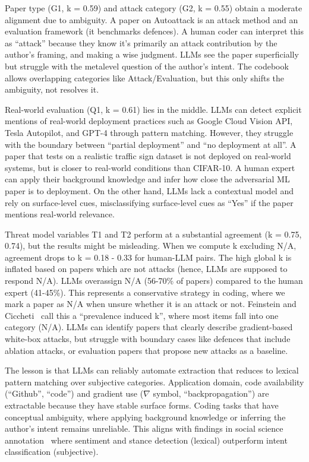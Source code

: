 \documentclass[conference,compsoc]{IEEEtran}
\begin{document}
Paper type (G1, k = 0.59) and attack category (G2, k = 0.55) obtain a moderate alignment due to ambiguity. A paper on Autoattack is an attack method and an evaluation framework (it benchmarks defences). A human coder can interpret this as ``attack'' because they know it's primarily an attack contribution by the author's framing, and making a wise judgment. LLMs see the paper superficially but struggle with the metalevel question of the author's intent. The codebook allows overlapping categories like Attack/Evaluation, but this only shifts the ambiguity, not resolves it.

Real-world evaluation (Q1, k = 0.61) lies in the middle. LLMs can detect explicit mentions of real-world deployment practices such as Google Cloud Vision API, Tesla Autopilot, and GPT-4 through pattern matching. However, they struggle with the boundary between ``partial deployment'' and ``no deployment at all''. A paper that tests on a realistic traffic sign dataset is not deployed on real-world systems, but is closer to real-world conditions than CIFAR-10. A human expert can apply their background knowledge and infer how close the adversarial ML paper is to deployment. On the other hand, LLMs lack a contextual model and rely on surface-level cues, misclassifying surface-level cues as ``Yes'' if the paper mentions real-world relevance.

Threat model variables T1 and T2 perform at a substantial agreement (k = 0.75, 0.74), but the results might be misleading. When we compute k excluding N/A, agreement drops to k = 0.18 - 0.33 for human-LLM pairs. The high global k is inflated based on papers which are not attacks (hence, LLMs are supposed to respond N/A). LLMs overassign N/A (56-70\% of papers) compared to the human expert (41-45\%). This represents a conservative strategy in coding, where we mark a paper as N/A when unsure whether it is an attack or not. Feinstein and Ciccheti~\cite{feinstein1990high} call this a ``prevalence induced k'', where most items fall into one category (N/A). LLMs can identify papers that clearly describe gradient-based white-box attacks, but struggle with boundary cases like defences that include ablation attacks, or evaluation papers that propose new attacks as a baseline.

The lesson is that LLMs can reliably automate extraction that reduces to lexical pattern matching over subjective categories. Application domain, code availability (``Github'', ``code'') and gradient use ($\nabla$ symbol, ``backpropagation'') are extractable because they have stable surface forms. Coding tasks that have conceptual ambiguity, where applying background knowledge or inferring the author's intent remains unreliable. This aligns with findings in social science annotation~\cite{ziems2024can} where sentiment and stance detection (lexical) outperform intent classification (subjective).
\end{document}
